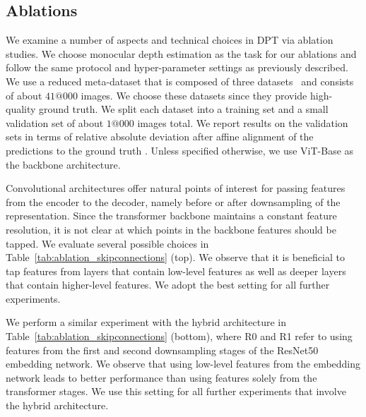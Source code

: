 \documentclass[10pt,twocolumn,letterpaper]{article}
\begin{document}
\subsection{Ablations}
We examine a number of aspects and technical choices in DPT via ablation
studies. We choose monocular depth estimation as the task for our ablations and
follow the same protocol and hyper-parameter settings as previously described.
We use a reduced meta-dataset that is composed of three
datasets~\cite{Xian2018,Xian2020,Yao2020} and consists of about $41@000$ images.
We choose these datasets since they provide high-quality ground truth. We split
each dataset into a training set and a small validation set of about $1@000$ images
total. We report results on
the validation sets in terms of relative absolute deviation after affine
alignment of the predictions to the ground truth \cite{Ranftl2020}. Unless
specified otherwise, we use ViT-Base as the backbone architecture.

 Convolutional architectures offer natural points of
interest for passing features from the encoder to the decoder, namely before or after
downsampling of the representation. Since the transformer backbone maintains a
constant feature resolution, it is not clear at which points in the backbone
features should be tapped. We evaluate several possible choices in
Table~\ref{tab:ablation_skipconnections} (top). We observe that it is beneficial to
tap features from layers that contain low-level features as well as
deeper layers that contain higher-level features. We adopt the best setting for
all further experiments.

We perform a similar experiment with the hybrid architecture in
Table~\ref{tab:ablation_skipconnections} (bottom), where R0 and R1 refer to
using features from the first and second downsampling stages of the ResNet50
embedding network. We observe that using low-level features from the embedding
network leads to better performance than using features solely from
the transformer stages. We use this setting for all further experiments that
involve the hybrid architecture.
\end{document}
